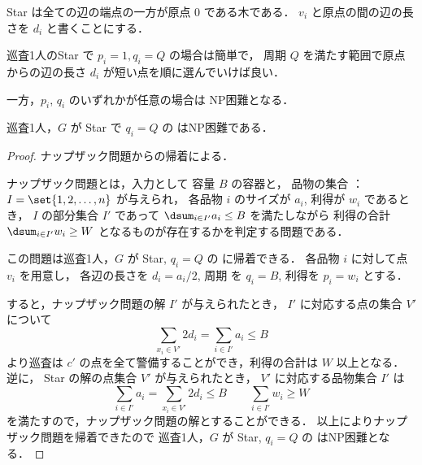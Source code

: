 Star は全ての辺の端点の一方が原点 $0$ である木である．
$v_i$ と原点の間の辺の長さを $d_i$ と書くことにする．

巡査1人のStar で $p_i = 1, q_i = Q$ の場合は簡単で，
周期 $Q$ を満たす範囲で原点からの辺の長さ $d_i$ が短い点を順に選んでいけば良い．

一方，$p_i$, $q_i$ のいずれかが任意の場合は NP困難となる．

\begin{theo}
	巡査1人，$G$ が Star で $q_i = Q$ の \maxprofit はNP困難である．
\end{theo}
\begin{proof}
ナップザック問題からの帰着による．

ナップザック問題とは，入力として
容量 $B$ の容器と，
品物の集合 ： $I = \set{ 1, 2, \ldots, n }$ が与えられ，
各品物 $i$ のサイズが $a_i$, 利得が $w_i$ であるとき，
$I$ の部分集合 $I'$ であって
$\dsum_{ i \in I'} a_i \leq B$ を満たしながら
利得の合計 $\dsum_{i \in I'} w_i \geq W$ となるものが存在するかを判定する問題である．

この問題は巡査1人，$G$ が Star, $q_i = Q$ の \maxprofit に帰着できる．
各品物 $i$ に対して点 $v_i$ を用意し，
各辺の長さを $d_i = a_i/2$, 周期 を $q_i = B$, 利得を $p_i = w_i$ とする．

すると，ナップザック問題の解 $I'$ が与えられたとき，
$I'$ に対応する点の集合 $V'$ について
\begin{equation}
  \sum_{x_i \in V'} 2 d_i = \sum_{i \in I'} a_i \leq B
\end{equation}
より巡査は $c'$ の点を全て警備することができ，利得の合計は $W$ 以上となる．
逆に， Star の解の点集合 $V'$ が与えられたとき，
$V'$ に対応する品物集合 $I'$ は
\begin{equation}
  \sum_{i \in I'} a_i = \sum_{x_i \in V'} 2 d_i \leq B
  \qquad
  \sum_{i \in I'} w_i \geq W
\end{equation}
を満たすので，ナップザック問題の解とすることができる．
以上によりナップザック問題を帰着できたので
巡査1人，$G$ が Star, $q_i = Q$ の \maxprofit はNP困難となる．
\end{proof}





